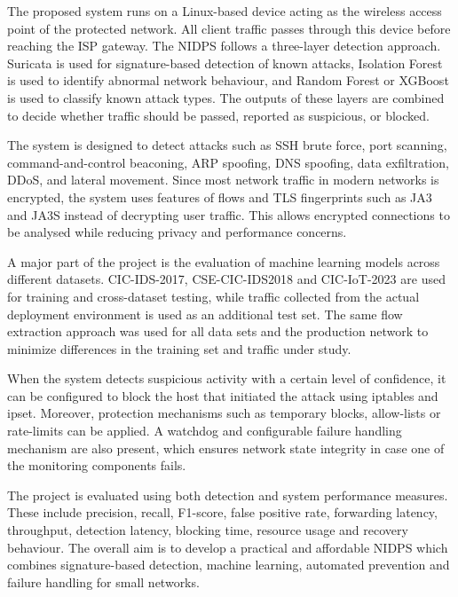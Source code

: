 \documentclass{FastFyp}
\begin{document}
\noindent The proposed system runs on a Linux-based device acting as the wireless access point of the protected network. All client traffic passes through this device before reaching the ISP gateway. The NIDPS follows a three-layer detection approach. Suricata is used for signature-based detection of known attacks, Isolation Forest is used to identify abnormal network behaviour, and Random Forest or XGBoost is used to classify known attack types. The outputs of these layers are combined to decide whether traffic should be passed, reported as suspicious, or blocked.

\noindent The system is designed to detect attacks such as SSH brute force, port scanning, command-and-control beaconing, ARP spoofing, DNS spoofing, data exfiltration, DDoS, and lateral movement. Since most network traffic in modern networks is encrypted, the system uses features of flows and TLS fingerprints such as JA3 and JA3S instead of decrypting user traffic. This allows encrypted connections to be analysed while reducing privacy and performance concerns.

\noindent A major part of the project is the evaluation of machine learning models across different datasets. CIC-IDS-2017, CSE-CIC-IDS2018 and CIC-IoT-2023 are used for training and cross-dataset testing, while traffic collected from the actual deployment environment is used as an additional test set. The same flow extraction approach was used for all data sets and the production network to minimize differences in the training set and traffic under study.

\noindent When the system detects suspicious activity with a certain level of confidence, it can be configured to block the host that initiated the attack using iptables and ipset. Moreover, protection mechanisms such as temporary blocks, allow-lists or rate-limits can be applied. A watchdog and configurable failure handling mechanism are also present, which ensures network state integrity in case one of the monitoring components fails.

\noindent The project is evaluated using both detection and system performance measures. These include precision, recall, F1-score, false positive rate, forwarding latency, throughput, detection latency, blocking time, resource usage and recovery behaviour. The overall aim is to develop a practical and affordable NIDPS which combines signature-based detection, machine learning, automated prevention and failure handling for small networks.
\clearpage

\pagestyle{fancy}
\tableofcontents
\clearpage
\listoffigures
{}
\clearpage
\listoftables
{}

\mainmatter






\addtocounter{chapter}{1} %






\end{document}
